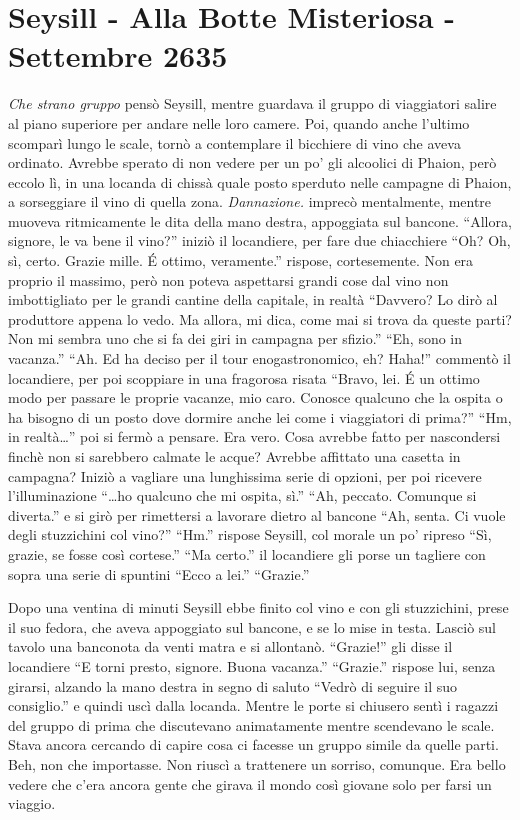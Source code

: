   \section{Seysill - Alla Botte Misteriosa - Settembre 2635}

    \emph{Che strano gruppo} pensò Seysill, mentre guardava il gruppo di
    viaggiatori salire al piano superiore per andare nelle loro camere.
    Poi, quando anche l'ultimo scomparì lungo le scale, tornò a contemplare
    il bicchiere di vino che aveva ordinato. Avrebbe sperato di non vedere
    per un po' gli alcoolici di Phaion, però eccolo lì, in una locanda di
    chissà quale posto sperduto nelle campagne di Phaion, a sorseggiare il
    vino di quella zona. \emph{Dannazione.} imprecò mentalmente, mentre
    muoveva ritmicamente le dita della mano destra, appoggiata sul bancone.
    ``Allora, signore, le va bene il vino?'' iniziò il locandiere, per fare
    due chiacchiere ``Oh? Oh, sì, certo. Grazie mille. \'E ottimo,
    veramente.'' rispose, cortesemente. Non era proprio il massimo, però
    non poteva aspettarsi grandi cose dal vino non imbottigliato per le
    grandi cantine della capitale, in realtà ``Davvero? Lo dirò al
    produttore appena lo vedo. Ma allora, mi dica, come mai si trova da
    queste parti? Non mi sembra uno che si fa dei giri in campagna per
    sfizio.'' ``Eh, sono in vacanza.'' ``Ah. Ed ha deciso per il tour
    enogastronomico, eh? Haha!'' commentò il locandiere, per poi scoppiare
    in una fragorosa risata ``Bravo, lei. \'E un ottimo modo per passare le
    proprie vacanze, mio caro. Conosce qualcuno che la ospita o ha bisogno
    di un posto dove dormire anche lei come i viaggiatori di prima?'' ``Hm,
    in realtà\dots{}'' poi si fermò a pensare. Era vero. Cosa avrebbe fatto
    per nascondersi finchè non si sarebbero calmate le acque? Avrebbe
    affittato una casetta in campagna? Iniziò a vagliare una lunghissima
    serie di opzioni, per poi ricevere l'illuminazione ``\dots{}ho qualcuno
    che mi ospita, sì.'' ``Ah, peccato. Comunque si diverta.'' e si girò
    per rimettersi a lavorare dietro al bancone ``Ah, senta. Ci vuole degli
    stuzzichini col vino?'' ``Hm.'' rispose Seysill, col morale un po'
    ripreso ``Sì, grazie, se fosse così cortese.'' ``Ma certo.'' il
    locandiere gli porse un tagliere con sopra una serie di spuntini ``Ecco
    a lei.'' ``Grazie.''

    Dopo una ventina di minuti Seysill ebbe finito col vino e con gli
    stuzzichini, prese il suo fedora, che aveva appoggiato sul bancone, e
    se lo mise in testa. Lasciò sul tavolo una banconota da venti matra e
    si allontanò. ``Grazie!'' gli disse il locandiere ``E torni presto,
    signore. Buona vacanza.'' ``Grazie.'' rispose lui, senza girarsi,
    alzando la mano destra in segno di saluto ``Vedrò di seguire il suo
    consiglio.'' e quindi uscì dalla locanda. Mentre le porte si chiusero
    sentì i ragazzi del gruppo di prima che discutevano animatamente mentre
    scendevano le scale. Stava ancora cercando di capire cosa ci facesse un
    gruppo simile da quelle parti. Beh, non che importasse. Non riuscì a
    trattenere un sorriso, comunque. Era bello vedere che c'era ancora
    gente che girava il mondo così giovane solo per farsi un viaggio.

